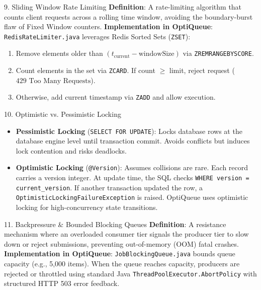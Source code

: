 \documentclass[11pt,a4paper]{article}
\begin{document}
\begin{conceptbox}{9. Sliding Window Rate Limiting}
\textbf{Definition}: A rate-limiting algorithm that counts client requests across a rolling time window, avoiding the boundary-burst flaw of Fixed Window counters.
\textbf{Implementation in OptiQueue}: \texttt{RedisRateLimiter.java} leverages Redis Sorted Sets (\texttt{ZSET}):
\begin{enumerate}
    \item Remove elements older than $(t_{\text{current}} - \text{windowSize})$ via \texttt{ZREMRANGEBYSCORE}.
    \item Count elements in the set via \texttt{ZCARD}. If count $\ge$ limit, reject request ($429\text{ Too Many Requests}$).
    \item Otherwise, add current timestamp via \texttt{ZADD} and allow execution.
\end{enumerate}
\end{conceptbox}

\begin{conceptbox}{10. Optimistic vs. Pessimistic Locking}
\begin{itemize}[leftmargin=1.5em]
    \item \textbf{Pessimistic Locking} (\texttt{SELECT FOR UPDATE}): Locks database rows at the database engine level until transaction commit. Avoids conflicts but induces lock contention and risks deadlocks.
    \item \textbf{Optimistic Locking} (\texttt{@Version}): Assumes collisions are rare. Each record carries a version integer. At update time, the SQL checks \texttt{WHERE version = current\_version}. If another transaction updated the row, a \texttt{OptimisticLockingFailureException} is raised. OptiQueue uses optimistic locking for high-concurrency state transitions.
\end{itemize}
\end{conceptbox}

\begin{conceptbox}{11. Backpressure \& Bounded Blocking Queues}
\textbf{Definition}: A resistance mechanism where an overloaded consumer tier signals the producer tier to slow down or reject submissions, preventing out-of-memory (OOM) fatal crashes.
\textbf{Implementation in OptiQueue}: \texttt{JobBlockingQueue.java} bounds queue capacity (e.g., 5,000 items). When the queue reaches capacity, producers are rejected or throttled using standard Java \texttt{ThreadPoolExecutor.AbortPolicy} with structured HTTP 503 error feedback.
\end{conceptbox}
\end{document}
